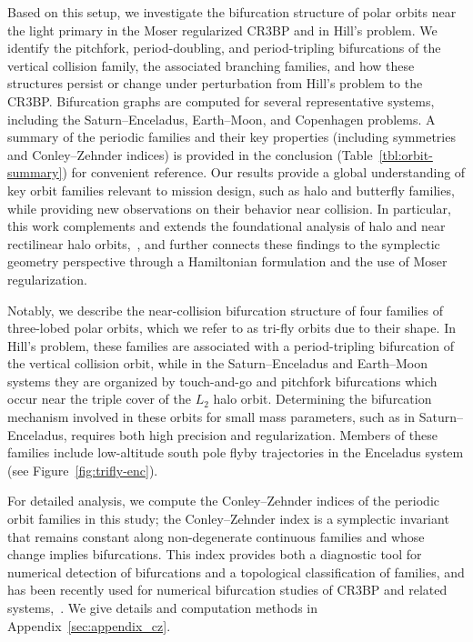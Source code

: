 \documentclass[pdflatex,sn-mathphys-ay]{sn-jnl}%
\theoremstyle{thmstyleone}%
\theoremstyle{thmstyletwo}%
\theoremstyle{thmstylethree}%
\begin{document}
Based on this setup, we investigate the bifurcation structure of polar orbits near the light primary in the Moser regularized CR3BP and in Hill's problem.
We identify the pitchfork, period-doubling, and period-tripling bifurcations of the vertical collision family, the associated branching families, and how these structures persist or change under perturbation from Hill's problem to the CR3BP. Bifurcation graphs are computed for several representative systems, including the Saturn--Enceladus, Earth--Moon, and Copenhagen problems. 
A summary of the periodic families and their key properties (including symmetries and Conley--Zehnder indices) is provided in the conclusion (Table~\ref{tbl:orbit-summary}) for convenient reference.
Our results provide a global understanding of key orbit families relevant to mission design, such as halo and butterfly families, while providing new observations on their behavior near collision. In particular, this work complements and extends the foundational analysis of halo and near rectilinear halo orbits,~\cite{Breakwell1979-lm,howell_three-dimensional_1984,howell-campbell_three-dimensional_1999,gomez_llibre_martinez_simo_dynamics_vol1}, and further connects these findings to the symplectic geometry perspective through a Hamiltonian formulation and the use of Moser regularization.

Notably, we describe the near-collision bifurcation structure of four families of three-lobed polar orbits, which we refer to as tri-fly orbits due to their shape. In Hill's problem, these families are associated with a period-tripling bifurcation of the vertical collision orbit, while in the Saturn--Enceladus and Earth--Moon systems they are organized by touch-and-go and pitchfork bifurcations which occur near the triple cover of the $L_2$ halo orbit. Determining the bifurcation mechanism involved in  these orbits for small mass parameters, such as in Saturn--Enceladus, requires both high precision and regularization.
Members of these families include low-altitude south pole flyby trajectories in the Enceladus system (see Figure~\ref{fig:trifly-enc}).

For detailed analysis, we compute the Conley--Zehnder indices of the periodic orbit families in this study; the Conley--Zehnder index is a symplectic invariant that remains constant along non-degenerate continuous families and whose change implies bifurcations. This index provides both a diagnostic tool for numerical detection of bifurcations and a topological classification of families, and has been recently used for numerical bifurcation studies of CR3BP and related systems,~\cite{moreno_aydin_van_Koert_Frauenfelder_Koh_Bifurcation_Graphs_2024,aydin_Batkhin_hill_2025,aydin_dro_2025}. We give details and computation methods in Appendix~\ref{sec:appendix_cz}.
\end{document}
